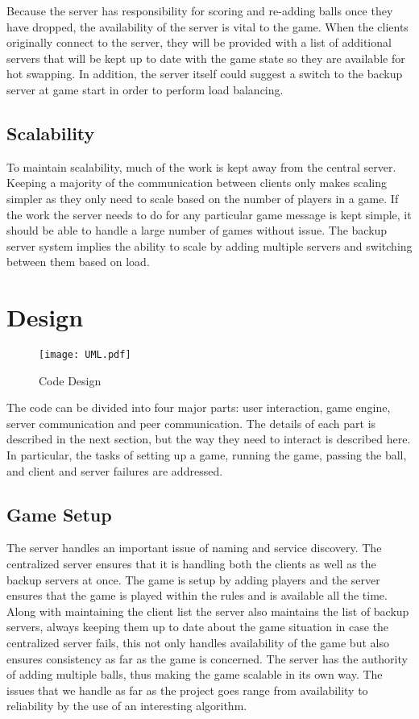 \documentclass{sig-alternate}
\begin{document}
Because the server has responsibility for scoring and re-adding balls once
they have dropped, the availability of the server is vital to the game.
When the clients originally connect to the server, they will be provided
with a list of additional servers that will be kept up to date with the
game state so they are available for hot swapping. In addition, the server
itself could suggest a switch to the backup server at game start in order
to perform load balancing.

\subsection{Scalability}

To maintain scalability, much of the work is kept away from the central
server.  Keeping a majority of the communication between clients only makes
scaling simpler as they only need to scale based on the number of players
in a game.  If the work the server needs to do for any particular game
message is kept simple, it should be able to handle a large number of games
without issue.  The backup server system implies the ability to scale by
adding multiple servers and switching between them based on load.


\section{Design}
\label{design}

\begin{figure}[htb]
	\label{code design}
	\begin{center}
		\texttt{[image: UML.pdf]}
		\caption{Code Design}
	\end{center}
\end{figure}

The code can be divided into four major parts: user interaction, game
engine, server communication and peer communication.  The details of each
part is described in the next section, but the way they need to interact is
described here.  In particular, the tasks of setting up a game, running the
game, passing the ball, and client and server failures are addressed.

\subsection{Game Setup}

The server handles an important issue of naming and service discovery.  The
centralized server ensures that it is handling both the clients as well as
the backup servers at once. The game is setup by adding players and the
server ensures that the game is played within the rules and is available
all the time. Along with maintaining the client list the server also
maintains the list of backup servers, always keeping them up to date about
the game situation in case the centralized server fails, this not only
handles availability of the game but also ensures consistency as far as the
game is concerned. The server has the authority of adding multiple balls,
thus making the game scalable in its own way. The issues that we handle as
far as the project goes range from availability to reliability by the use
of an interesting algorithm.
\end{document}
